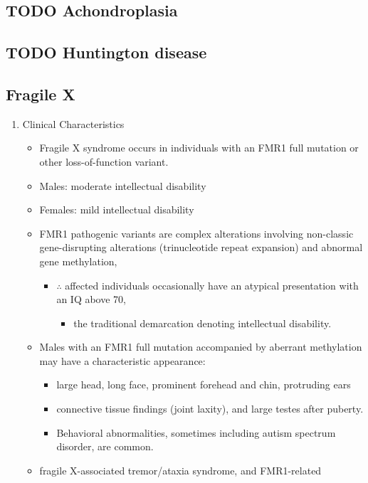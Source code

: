 \documentclass{scrartcl}
\begin{document}
\subsection{{\bfseries\sffamily TODO} Achondroplasia}
\label{sec:org98c684a}
\subsection{{\bfseries\sffamily TODO} Huntington disease}
\label{sec:orga10850d}
\subsection{Fragile X}
\label{sec:orged92039}
\begin{enumerate}
\item Clinical Characteristics
\label{sec:orgca53e47}
\begin{itemize}
\item Fragile X syndrome occurs in individuals with an FMR1 full mutation
or other loss-of-function variant.
\item Males: moderate intellectual disability
\item Females: mild intellectual disability
\item FMR1 pathogenic variants are complex alterations involving non-classic
gene-disrupting alterations (trinucleotide repeat expansion) and
abnormal gene methylation,
\begin{itemize}
\item \(\therefore\) affected individuals occasionally have an atypical presentation with an IQ above 70,
\begin{itemize}
\item the traditional  demarcation denoting intellectual disability.
\end{itemize}
\end{itemize}
\item Males with an FMR1 full mutation accompanied by aberrant methylation may have a characteristic appearance:
\begin{itemize}
\item large head, long face, prominent forehead and chin, protruding ears
\item connective tissue findings (joint laxity), and large testes after puberty.
\item Behavioral abnormalities, sometimes including autism spectrum disorder, are common.
\end{itemize}
\item fragile X-associated tremor/ataxia syndrome, and FMR1-related

\end{itemize}
\end{enumerate}
\end{document}
